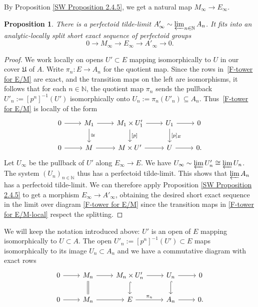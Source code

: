 \documentclass[10pt,oneside]{amsart}
\newtheorem{proposition}[theorem]{Proposition}
\theoremstyle{definition}
\newcommand{\N}{\mathbb{N}}
\begin{document}
		By Proposition \ref{SW Proposition 2.4.5}, we get a natural map $M_\infty\to E_\infty$. 
		\begin{proposition}\label{M_infty->E_infty->A'_infty}
			There is a perfectoid tilde-limit $A'_\infty\sim \varprojlim_{n\in\N} A_n$. It fits into an analytic-locally split short exact sequence of perfectoid groups 
			\[0\to M_\infty\to E_\infty\to A'_\infty\to 0.\]
		\end{proposition}
		\begin{proof}
			We work locally on opens $U'\subset E$ mapping isomorphically to $U$ in our cover $\mathfrak U$ of $A$. Write $\pi_n\colon E\to A_n$ for the quotient map. Since the rows in~\eqref{F-tower for E/M} are exact, and the transition maps on the left are isomorphisms, it follows that for each $n\in \mathbb{N}$, the quotient map $\pi_n$  sends the pullback $U'_n:=[p^n]^{-1}(U')$ isomorphically onto $U_n:=\pi_n(U'_n)\subseteq A_n$. Thus~\eqref{F-tower for E/M} is locally of the form
				\begin{equation}\label{F-tower for E/M-local}
				\begin{tikzcd}
				0 \arrow[r] & M_1\arrow[d, "\cong"] \arrow[r] &  M_1\times U_1' \arrow[d, "{[p]}"] \arrow[r] &U_1 \arrow[d, "{[p]_E}"] \arrow[r] & 0 \\
				0 \arrow[r] & M \arrow[r] & M\times U' \arrow[r] & U \arrow[r] & 0.
				\end{tikzcd}
				\end{equation}
			Let $U_\infty$ be the pullback of $U'$ along $E_\infty\to E$. We have $U_\infty\sim \varprojlim U'_n\cong \varprojlim U_n$. The system $(U_n)_{n\in \mathbb{N}}$ thus has a perfectoid tilde-limit. This shows that $\varprojlim A_n$ has a perfectoid tilde-limit. We can therefore apply Proposition \ref{SW Proposition 2.4.5} to get a morphism $E_\infty\rightarrow A'_\infty$, obtaining the desired short exact sequence in the limit over diagram \eqref{F-tower for E/M} since the transition maps in \eqref{F-tower for E/M-local} respect the splitting. 
		\end{proof}
	
We will keep the notation introduced above: $U'$ is an open of $E$ mapping isomorphically to $U\subset A$. The open $U'_n:=[p^n]^{-1}(U')\subset E$ maps isomorphically to its image $U_n\subset A_n$ and we have a commutative diagram with exact rows
\[
 		\begin{tikzcd}
		0 \arrow[r] & M_n \arrow[d, equal] \arrow[r] & M_n\times U'_n \arrow[d,hook] \arrow[r] &  U_n\arrow[d, hook] \arrow[r] & 0 \\
		0 \arrow[r] & M_n \arrow[r] & E \arrow[r,"{\pi_n}"] & A_n \arrow[r] & 0.
		\end{tikzcd}
\]
	
\end{document}
